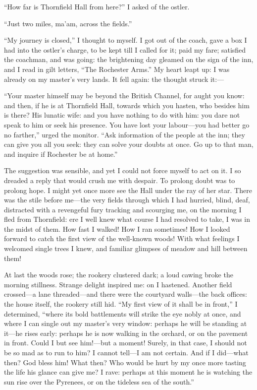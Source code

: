 \enquote{How far is Thornfield Hall from here?} I asked of the ostler.

\enquote{Just two miles, ma'am, across the fields.}

\enquote{My journey is closed,} I thought to myself. I got out of the
coach, gave a box I had into the ostler's charge, to be kept till I
called for it; paid my fare; satisfied the coachman, and was going: the
brightening day gleamed on the sign of the inn, and I read in gilt
letters, \enquote{The Rochester Arms.} My heart leapt up: I was already
on my master's very lands. It fell again: the thought struck it:---

\enquote{Your master himself may be beyond the British Channel, for
aught you know: and then, if he is at Thornfield Hall, towards which you
hasten, who besides him is there? His lunatic wife: and you have
nothing to do with him: you dare not speak to him or seek his presence. 
You have lost your labour---you had better go no farther,} urged the
monitor. \enquote{Ask information of the people at the inn; they can
give you all you seek: they can solve your doubts at once. Go up to
that man, and inquire if \Mr{} Rochester be at home.}

The suggestion was sensible, and yet I could not force myself to act on
it. I so dreaded a reply that would crush me with despair. To prolong
doubt was to prolong hope. I might yet once more see the Hall under the
ray of her star. There was the stile before me---the very fields
through which I had hurried, blind, deaf, distracted with a revengeful
fury tracking and scourging me, on the morning I fled from Thornfield:
ere I well knew what course I had resolved to take, I was in the midst
of them. How fast I walked! How I ran sometimes! How I looked forward
to catch the first view of the well-known woods! With what feelings I
welcomed single trees I knew, and familiar glimpses of meadow and hill
between them!

At last the woods rose; the rookery clustered dark; a loud cawing broke
the morning stillness. Strange delight inspired me: on I hastened. 
Another field crossed---a lane threaded---and there were the courtyard
walls---the back offices: the house itself, the rookery still hid. 
\enquote{My first view of it shall be in front,} I determined,
\enquote{where its bold battlements will strike the eye nobly at once,
and where I can single out my master's very window: perhaps he will be
standing at it---he rises early: perhaps he is now walking in the
orchard, or on the pavement in front. Could I but see him!---but a
moment! Surely, in that case, I should not be so mad as to run to him? 
I cannot tell---I am not certain. And if I did---what then? God bless
him! What then? Who would be hurt by my once more tasting the life his
glance can give me? I rave: perhaps at this moment he is watching the
sun rise over the Pyrenees, or on the tideless sea of the south.}

